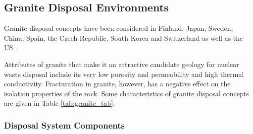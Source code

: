 
% 


\subsection{Granite Disposal Environments}

Granite disposal concepts have been considered in Finland, Japan, Sweden, China,  
Spain, the Czech Republic, South Korea and Switzerland as well as the \gls{US} 
\cite{hardin_generic_2011, andra_granite:_2005, von_lensa_red-impact_2008}. 

Attributes of granite that make it an attractive candidate geology for nuclear 
waste disposal include its very low porosity and permeability and high thermal 
conductivity. Fracturation in granite, however, has a negative effect on the 
isolation properties of the rock.
Some characteristics of granite disposal 
concepts are given in Table \ref{tab:granite_tab}.   



\subsubsection{Disposal System Components}

